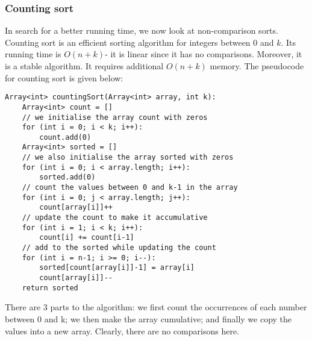 \documentclass[a4paper, openany]{memoir}
\begin{document}
\subsubsection{Counting sort}
In search for a better running time, we now look at non-comparison sorts. Counting sort is an efficient sorting algorithm for integers between $0$ and $k$. Its running time is $O(n+k)$- it is linear since it has no comparisons. Moreover, it is a stable algorithm. It requires additional $O(n+k)$ memory. The pseudocode for counting sort is given below:
\begin{lstlisting}[language=pseudocode]
Array<int> countingSort(Array<int> array, int k):
    Array<int> count = []
    // we initialise the array count with zeros
    for (int i = 0; i < k; i++):
        count.add(0)
    Array<int> sorted = []
    // we also initialise the array sorted with zeros
    for (int i = 0; i < array.length; i++):
        sorted.add(0)
    // count the values between 0 and k-1 in the array
    for (int i = 0; j < array.length; j++):
        count[array[i]]++
    // update the count to make it accumulative
    for (int i = 1; i < k; i++):
        count[i] += count[i-1]
    // add to the sorted while updating the count
    for (int i = n-1; i >= 0; i--):
        sorted[count[array[i]]-1] = array[i]
        count[array[i]]--
    return sorted
\end{lstlisting}
There are 3 parts to the algorithm: we first count the occurrences of each number between 0 and k; we then make the array cumulative; and finally we copy the values into a new array. Clearly, there are no comparisons here.
\end{document}
